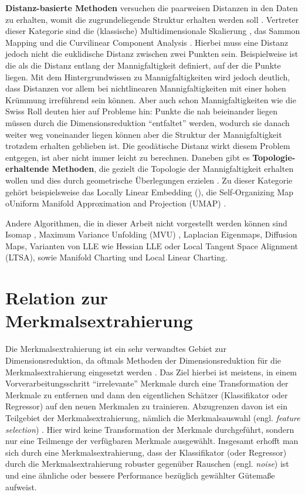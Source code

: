 \textbf{Distanz-basierte Methoden} versuchen die paarweisen Distanzen in den Daten zu erhalten, womit die zugrundeliegende Struktur erhalten werden soll \parencite[3]{Gracia.2014}. Vertreter dieser Kategorie sind die (klassische) Multidimensionale
Skalierung \parencites{Kruskal.1964}{Cox.2008}, das Sammon Mapping \addref und die Curvilinear Component Analysis
\addref. Hierbei muss eine Distanz jedoch nicht die euklidische Distanz zwischen zwei Punkten sein.
Beispielweise ist die  als die Distanz entlang der Mannigfaltigkeit
definiert, auf der die Punkte liegen. Mit dem Hintergrundwissen zu Mannigfaltigkeiten wird jedoch
deutlich, dass Distanzen vor allem bei nichtlinearen Mannigfaltigkeiten mit einer hohen Krümmung
irreführend sein können. Aber auch schon Mannigfaltigkeiten wie die Swiss Roll deuten hier auf
Probleme hin: Punkte die nah beieinander liegen müssen durch die Dimensionsreduktion
\enquote{entfaltet} werden, wodurch sie danach weiter weg voneinander liegen können aber die
Struktur der Mannigfaltigkeit trotzdem erhalten geblieben ist. Die geodätische Distanz wirkt diesem
Problem entgegen, ist aber nicht immer leicht zu berechnen. Daneben gibt es
\textbf{Topologie-erhaltende Methoden}, die gezielt die Topologie der Mannigfaltigkeit erhalten
wollen und dies durch geometrische Überlegungen erzielen \parencite[4]{Gracia.2014}. Zu dieser Kategorie gehört beispielsweise das Locally Linear Embedding
(), die Self-Organizing Map \parencite{Kohonen.1990} oUniform Manifold Approximation and Projection (UMAP) \parencite{McInnes.2018}.

Andere Algorithmen, die in dieser Arbeit nicht vorgestellt werden können sind Isomap \parencite{Tenenbaum.2000}, Maximum Variance Unfolding (MVU) \parencite{Weinberger.2006}, Laplacian Eigenmaps, Diffusion Maps, Varianten von LLE wie Hessian LLE
oder Local Tangent Space Alignment (LTSA), sowie Manifold Charting und Local Linear
Charting.\addref

\section{Relation zur Merkmalsextrahierung}
\label{ch:Dimensionsreduktion:Merkmalsextrahierung}

Die Merkmalsextrahierung ist ein sehr verwandtes Gebiet zur Dimensionsreduktion, da oftmals
Methoden der Dimensionsreduktion für die Merkmalsextrahierung eingesetzt werden \parencite[3]{Guyon.2006b}. Das Ziel hierbei ist meistens, in einem Vorverarbeitungsschritt
\enquote{irrelevante} Merkmale durch eine Transformation der Merkmale zu entfernen und dann den
eigentlichen Schätzer (Klassifikator oder Regressor) auf den neuen Merkmalen zu trainieren.
Abzugrenzen davon ist ein Teilgebiet der Merkmalsextrahierung, nämlich die Merkmalsauswahl (engl.
\textit{feature selection}) \parencite{Blum.1997}. Hier wird keine Transformation der Merkmale durchgeführt, sondern nur eine
Teilmenge der verfügbaren Merkmale ausgewählt. Insgesamt erhofft man sich durch eine
Merkmalsextrahierung, dass der Klassifikator (oder Regressor) durch die Merkmalsextrahierung
robuster gegenüber Rauschen (engl. \textit{noise}) ist und eine ähnliche oder bessere Performance
bezüglich gewählter Gütemaße aufweist.

